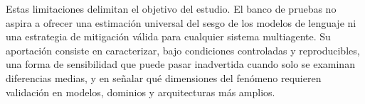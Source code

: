 Estas limitaciones delimitan el objetivo del estudio. El banco de pruebas no aspira a ofrecer una estimación universal del sesgo de los modelos de lenguaje ni una estrategia de mitigación válida para cualquier sistema multiagente. Su aportación consiste en caracterizar, bajo condiciones controladas y reproducibles, una forma de sensibilidad que puede pasar inadvertida cuando solo se examinan diferencias medias, y en señalar qué dimensiones del fenómeno requieren validación en modelos, dominios y arquitecturas más amplios.